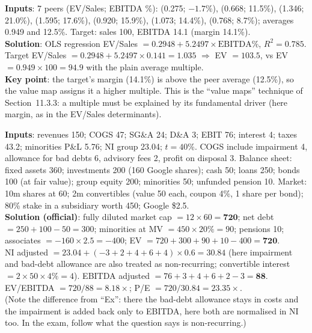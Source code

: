 \begin{exbox}
\textbf{Inputs}: 7 peers (EV/Sales; EBITDA \%): (0.275; $-1.7\%$), (0.668; 11.5\%), (1.346; 21.0\%), (1.595; 17.6\%), (0.920; 15.9\%), (1.073; 14.4\%), (0.768; 8.7\%); averages 0.949 and 12.5\%. Target: sales 100, EBITDA 14.1 (margin 14.1\%).\\
\textbf{Solution}: OLS regression EV/Sales $=0.2948+5.2497\times\text{EBITDA\%}$, $R^2=0.785$.\\
Target EV/Sales $=0.2948+5.2497\times0.141=\mathbf{1.035}$ $\Rightarrow$ EV $=\mathbf{103.5}$, vs EV $=0.949\times100=\mathbf{94.9}$ with the plain average multiple.\\
\textbf{Key point}: the target's margin (14.1\%) is above the peer average (12.5\%), so the value map assigns it a higher multiple. This is the ``value maps'' technique of Section~11.3.3: a multiple must be explained by its fundamental driver (here margin, as in the EV/Sales determinants).
\end{exbox}

\begin{exbox}
\textbf{Inputs}: revenues 150; COGS 47; SG\&A 24; D\&A 3; EBIT 76; interest 4; taxes 43.2; minorities P\&L 5.76; NI group 23.04; $t=40\%$. COGS include impairment 4, allowance for bad debts 6, advisory fees 2, profit on disposal 3. Balance sheet: fixed assets 360; investments 200 (160 Google shares); cash 50; loans 250; bonds 100 (at fair value); group equity 200; minorities 50; unfunded pension 10. Market: 10m shares at 60; 2m convertibles (value 50 each, coupon 4\%, 1 share per bond); 80\% stake in a subsidiary worth 450; Google \$2.5.\\
\textbf{Solution (official)}: fully diluted market cap $=12\times60=\mathbf{720}$; net debt $=250+100-50=300$; minorities at MV $=450\times20\%=90$; pensions 10; associates $=-160\times2.5=-400$; EV $=720+300+90+10-400=\mathbf{720}$.\\
NI adjusted $=23.04+(-3+2+4+6+4)\times0.6=\mathbf{30.84}$ (here impairment and bad-debt allowance are also treated as non-recurring; convertible interest $=2\times50\times4\%=4$). EBITDA adjusted $=76+3+4+6+2-3=\mathbf{88}$. EV/EBITDA $=720/88=\mathbf{8.18\times}$; P/E $=720/30.84=\mathbf{23.35\times}$.\\
\footnotesize(Note the difference from ``Ex'': there the bad-debt allowance stays in costs and the impairment is added back only to EBITDA, here both are normalised in NI too. In the exam, follow what the question says is non-recurring.)\normalsize
\end{exbox}

